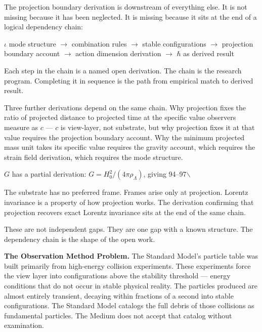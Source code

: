 \documentclass[11pt,letterpaper]{article}
\begin{document}
The projection boundary derivation is downstream of everything else. It is not missing because it has been neglected. It is missing because it sits at the end of a logical dependency chain:

\(\iota\) mode structure \(\to\) combination rules \(\to\) stable configurations \(\to\) projection boundary account \(\to\) action dimension derivation \(\to\) \(\hbar\) as derived result

Each step in the chain is a named open derivation. The chain is the research program. Completing it in sequence is the path from empirical match to derived result.

Three further derivations depend on the same chain. Why projection fixes the ratio of projected distance to projected time at the specific value observers measure as \(c\) --- \(c\) is view-layer, not substrate, but why projection fixes it at that value requires the projection boundary account. Why the minimum projected mass unit takes its specific value requires the gravity account, which requires the strain field derivation, which requires the mode structure.

\(G\) has a partial derivation: \(G = H_0^2/(4\pi\rho_\Lambda)\), giving 94--97$\backslash$%

The substrate has no preferred frame. Frames arise only at projection. Lorentz invariance is a property of how projection works. The derivation confirming that projection recovers exact Lorentz invariance sits at the end of the same chain.

These are not independent gaps. They are one gap with a known structure. The dependency chain is the shape of the open work.

\textbf{The Observation Method Problem.} The Standard Model's particle table was built primarily from high-energy collision experiments. These experiments force the view layer into configurations above the stability threshold --- energy conditions that do not occur in stable physical reality. The particles produced are almost entirely transient, decaying within fractions of a second into stable configurations. The Standard Model catalogs the full debris of those collisions as fundamental particles. The Medium does not accept that catalog without examination.
\end{document}
